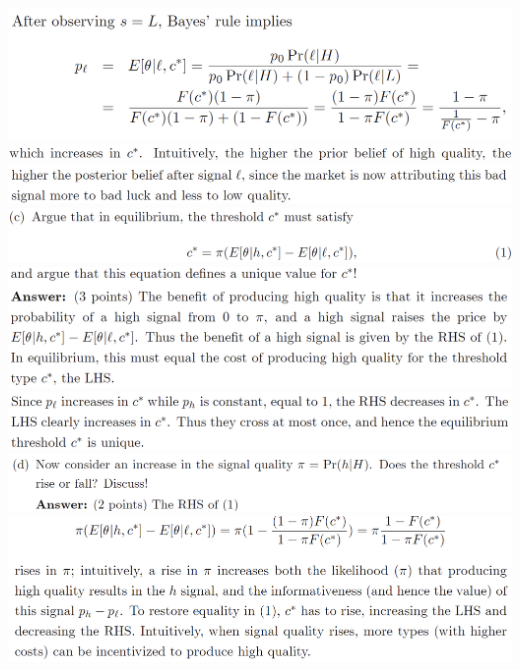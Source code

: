 \documentclass[8pt,landscape]{extarticle}
\begin{document}
\begin{multicols*}{3}
    \includegraphics[width=0.8\linewidth,keepaspectratio]{Screenshots/Screenshot 2024-03-15 094040.png}
    \includegraphics[width=0.89\linewidth,keepaspectratio]{Screenshots/Screenshot 2024-03-15 094044.png}
    \includegraphics[width=0.9\linewidth,keepaspectratio]{Screenshots/Screenshot 2024-03-15 094048.png}
    \includegraphics[width=0.93\linewidth,keepaspectratio]{Screenshots/Screenshot 2024-03-15 094054.png}
    \includegraphics[width=0.9\linewidth,keepaspectratio]{Screenshots/Screenshot 2024-03-15 094059.png}
    \includegraphics[width=0.9\linewidth,keepaspectratio]{Screenshots/Screenshot 2024-03-15 094105.png}
    \includegraphics[width=0.96\linewidth,keepaspectratio]{Screenshots/Screenshot 2024-03-15 094111.png}
    \includegraphics[width=0.91\linewidth,keepaspectratio]{Screenshots/Screenshot 2024-03-15 094116.png}
    
\end{multicols*}
\end{document}
